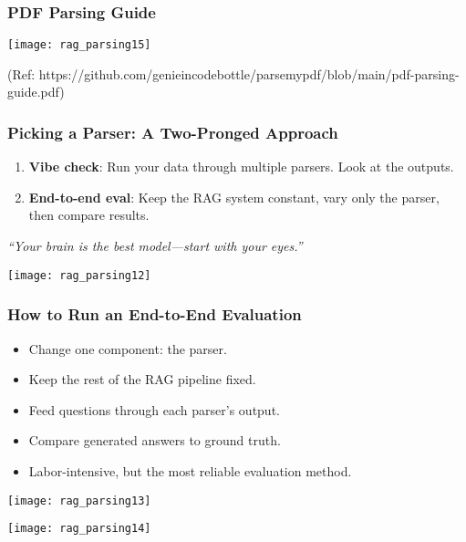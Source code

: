\begin{frame}[fragile]\frametitle{PDF Parsing Guide}

    \begin{center}
      \texttt{[image: rag\_parsing15]}
	  
	  {\tiny (Ref: https://github.com/genieincodebottle/parsemypdf/blob/main/pdf-parsing-guide.pdf)}
    \end{center}    
\end{frame}

\begin{frame}[fragile]\frametitle{Picking a Parser: A Two-Pronged Approach}
  \begin{enumerate}
    \item \textbf{Vibe check}: Run your data through multiple parsers. Look at the outputs.
    \item \textbf{End-to-end eval}: Keep the RAG system constant, vary only the parser, then compare results.
  \end{enumerate}
  \vspace{1em}
  \textit{“Your brain is the best model—start with your eyes.”}
  
    \begin{center}
      \texttt{[image: rag\_parsing12]}
    \end{center}    
\end{frame}

\begin{frame}[fragile]\frametitle{How to Run an End-to-End Evaluation}
  \begin{itemize}
    \item Change one component: the parser.
    \item Keep the rest of the RAG pipeline fixed.
    \item Feed questions through each parser’s output.
    \item Compare generated answers to ground truth.
    \item Labor-intensive, but the most reliable evaluation method.
  \end{itemize}
  
    \begin{center}
      \texttt{[image: rag\_parsing13]}
	  
      \texttt{[image: rag\_parsing14]}
	  
    \end{center}   
\end{frame}

